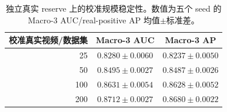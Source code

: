 \begin{table}[!t]
  \centering
  \caption{独立真实 reserve 上的校准规模稳定性。数值为五个 seed 的 Macro-3 AUC/real-positive AP 均值$\pm$标准差。}
  \label{tab:u0_calibration_stability}
  \begin{tabular}{rcc}
    \toprule
    校准真实视频/数据集 & Macro-3 AUC & Macro-3 AP \\
    \midrule
    25  & $0.8280\pm0.0060$ & $0.8237\pm0.0050$ \\
    50  & $0.8495\pm0.0027$ & $0.8487\pm0.0026$ \\
    100 & $0.8631\pm0.0054$ & $0.8628\pm0.0052$ \\
    200 & $\mathbf{0.8712\pm0.0027}$ & $\mathbf{0.8680\pm0.0022}$ \\
    \bottomrule
  \end{tabular}
\end{table}
